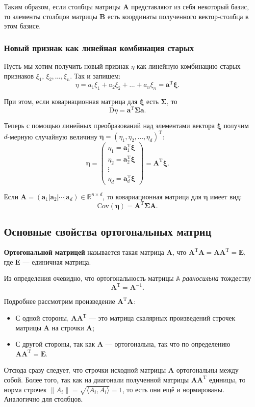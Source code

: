\documentclass[12pt,a4paper,final]{article}
\begin{document}
\noindent Таким образом, если столбцы матрицы $\bm A$ представляют из себя некоторый базис, то элементы столбцов матрицы $\bm B$ есть координаты полученного вектор-столбца в этом базисе.

\subsubsection*{Новый признак как линейная комбинация старых}

Пусть мы хотим получить новый признак $\eta$ как линейную комбинацию старых признаков $\xi_1,\,\xi_2,\ldots , \xi_n$. Так и запишем:
$$
\eta = a_1\xi_1 + a_2\xi_2 + \ldots + a_n\xi_n = \bm a^\textrm{T} \bm \xi.
$$

\noindent При этом, если ковариационная матрица для $\bm \xi$ есть $\bm \Sigma$, то $$ \mathrm D \eta = \bm a^\mathrm{T} \bm\Sigma \bm a.$$

\noindent Теперь с помощью линейных преобразований над элементами вектора $\bm \xi$ получим $d$-мерную случайную величину $\bm \eta = \left(\eta_1, \eta_2, \ldots, \eta_d\right)^\mathrm{T}$:
$$
\bm \eta = \left(\begin{matrix}
\eta_1 = \bm a_1^\mathrm{T} \bm\xi \\ \eta_2 = \bm a_2^\mathrm{T} \bm\xi \\ \vdots \\  \eta_d = \bm a_d^\mathrm{T} \bm\xi
\end{matrix} \right) = \bm A^\mathrm{T}\bm\xi.
$$

\noindent Если $\bm A = \left( \bm a_1 | \bm a_2 | \cdots | \bm a_d \right) \in \mathbb R^{n \times d}$, то ковариационная матрица для $\bm\eta$ имеет вид: $$\textrm{Cov}(\bm\eta) = \bm A^\mathrm{T} \bm \Sigma \bm A.$$

\subsection{Основные свойства ортогональных матриц}

\textbf{Ортогональной матрицей} называется такая матрица $\bm A$, что $\bm A^\mathrm{T}\bm A = \bm A \bm A ^\mathrm{T} = \bm E$, где $\bm E$ --- единичная матрица.

\noindent Из определения очевидно, что ортогональность матрицы $\mathbb A$ \textit{равносильна} тождеству $$\bm A^\mathrm{T} = \bm A^{-1}.$$

\noindent Подробнее рассмотрим произведение $\bm A^\mathrm{T} \bm A$:

\begin{itemize}
\item С одной стороны, $\bm A \bm A^\mathrm{T}$ --- это матрица скалярных произведений строчек матрицы $\bm A$ на строчки $\bm A$;
\item С другой стороны, так как $\bm A$ --- ортогональна, так что по определению  $\bm A \bm A^\mathrm{T} = \bm E$. 
\end{itemize}
Отсюда сразу следует, что строчки исходной матрицы $\bm A$ ортогональны между собой. Более того, так как на диагонали полученной матрицы $\bm A \bm A^\mathrm{T}$ единицы, то норма строчек $\|A_{i}\| = \sqrt{\langle A_{i}, A_{i} \rangle} = 1$, то есть они ещё и нормированы. Аналогично для столбцов.
\end{document}
